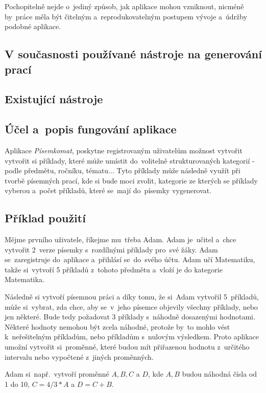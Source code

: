 \documentclass[14pt,a4paper]{article}
\begin{document}
    Pochopitelně nejde o~jediný způsob, jak aplikace mohou vzniknout, nicméně by~práce měla být čitelným a~reprodukovatelným postupem vývoje
    a~údržby podobné aplikace.
        
        \subsection{V současnosti používané nástroje na generování prací}
        \subsection{Existující nástroje}

        \subsection{Účel a~popis fungování aplikace}
        Aplikace \emph{Písemkomat}, poskytne registrovaným uživatelům možnost vytvořit vytvořit si příklady, které může umístit do~volitelně
        strukturovaných kategorií - podle předmětu, ročníku, tématu... Tyto příklady může následně využít při tvorbě písemných prací,
        kde si bude moci zvolit, kategorie ze kterých se příklady vyberou a~počet příkladů, které se~mají do~písemky vygenerovat. 
        \subsection{Příklad použití}
        Mějme prvního uživatele, říkejme mu~třeba Adam. Adam je~učitel a~chce vytvořit 2~verze písemky s~rozdílnými příklady pro~své žáky.
        Adam se~zaregistruje do~aplikace a~přihlásí se~do~svého účtu. Adam učí Matematiku, takže si~vytvoří 5 příkladů z~tohoto předmětu
        a~vloží je do kategorie Matematika.

        Následně si vytvoří písemnou práci a díky tomu, že si~Adam vytvořil 5~příkladů, může si~vybrat, zda chce,
        aby se~v~jeho písemce objevily všechny příklady, nebo jen některé. Bude tedy požadovat 3 příklady s~náhodně dosazenými hodnotami.
        Některé hodnoty nemohou být zcela náhodné, protože by~to mohlo vést k~neřešitelným příkladům, nebo příkladům s~nulovým výsledkem.
        Proto aplikace umožní vytvořit si~proměnné, které budou mít přiřazenou hodnotu z~určitého intervalu nebo vypočtené z~jiných proměnných.

        Adam si~např.~vytvoří proměnné $A, B, C$ a $D$, kde $A, B$ budou náhodná čísla od 1 do 10, $C = 4/3*A$ a $D = C + B$.
\end{document}
